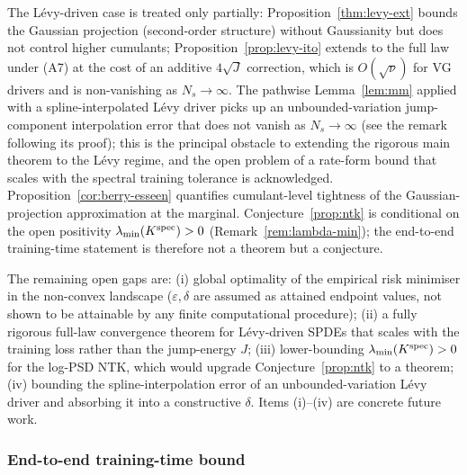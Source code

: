 \documentclass[review,12pt]{elsarticle}
\begin{document}
The L\'evy-driven case is treated only partially:
Proposition~\ref{thm:levy-ext} bounds the Gaussian projection
(second-order structure) without Gaussianity but does not control
higher cumulants; Proposition~\ref{prop:levy-ito} extends to the
full law under (A7) at the cost of an additive $4\sqrt J$
correction, which is $O(\sqrt\nu)$ for VG drivers and is
non-vanishing as $N_s \to \infty$. The pathwise Lemma~\ref{lem:mm}
applied with a spline-interpolated L\'evy driver picks up an
unbounded-variation jump-component interpolation error that does
not vanish as $N_s \to \infty$ (see the remark following its proof);
this is the principal obstacle to extending the rigorous main theorem
to the L\'evy regime, and the open problem of a rate-form bound that
scales with the spectral training tolerance is acknowledged.
Proposition~\ref{cor:berry-esseen} quantifies cumulant-level
tightness of the Gaussian-projection approximation at the marginal.
Conjecture~\ref{prop:ntk} is conditional on the open positivity
$\lambda_{\min}(K^{\rm spec}) > 0$ (Remark~\ref{rem:lambda-min});
the end-to-end training-time statement is therefore not a theorem
but a conjecture.

The remaining open gaps are:
(i) global optimality of the empirical risk minimiser in the
non-convex landscape ($\varepsilon, \delta$ are assumed as attained
endpoint values, not shown to be attainable by any finite
computational procedure);
(ii) a fully rigorous full-law convergence theorem for L\'evy-driven
SPDEs that scales with the training loss rather than the
jump-energy $J$;
(iii) lower-bounding $\lambda_{\min}(K^{\rm spec}) > 0$ for the
log-PSD NTK, which would upgrade Conjecture~\ref{prop:ntk} to a
theorem;
(iv) bounding the spline-interpolation error of an
unbounded-variation L\'evy driver and absorbing it into a
constructive $\delta$.
Items (i)--(iv) are concrete future work.

\subsubsection{End-to-end training-time bound}
\label{subsec:training-time}
\end{document}
